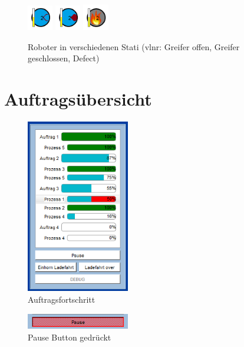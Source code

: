 \begin{figure}[htb]
    \centering
    \includegraphics[width=0.1\textwidth]{Abbildungen/RobotinoGoffen.png}
    \includegraphics[width=0.1\textwidth]{Abbildungen/RobotinoGZu.png}
    \includegraphics[width=0.1\textwidth]{Abbildungen/RobotinoDefect.png}
    \caption{Roboter in verschiedenen Stati (vlnr: Greifer offen, Greifer geschlossen, Defect)}		
    \label{fig:Robotino}
\end{figure}

\section{Auftragsübersicht}

\begin{figure}[htb]
    \centering
    \includegraphics[width=0.4\textwidth]{Abbildungen/Auftragsfortschritt.png}
    \caption{Auftragsfortschritt}		
    \label{fig:Auftragsfortschritt}
\end{figure}

\begin{figure}[htb]
    \centering
    \includegraphics[width=0.4\textwidth]{Abbildungen/Pause.png}
    \caption{Pause Button gedrückt}		
    \label{fig:Pause}
\end{figure}

